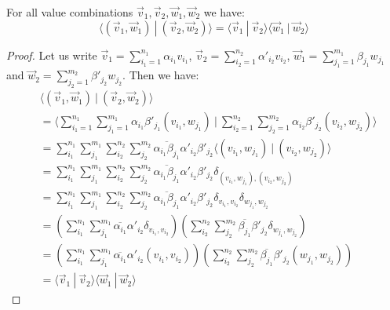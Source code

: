 \documentclass[a4paper,UKenglish,numberwithinsect,pdfa,anonymous]{lipics-v2021}
\theoremstyle{restatestyle}
\def\scal#1#2{\langle{#1}~|~{#2}\rangle}
\def\Pair#1#2{(#1,#2)} %
\def\Kron#1#2{\ensuremath{\delta_{#1,#2}}}
\begin{document}
\begin{theorem}\label{prop:InnerProdPairs} For all value combinations $\vec{v}_{1}, \vec{v}_{2}, \vec{w}_{1}, \vec{w}_{2}$ we have:
\[
\scal{\Pair{\vec{v}_{1}}{\vec{w}_{1}}}{\Pair{\vec{v}_{2}}{\vec{w}_{2}}} = \scal{\vec{v}_{1}}{\vec{v}_{2}}\scal{\vec{w}_{1}}{\vec{w}_{2}}
\]
\begin{proof}
    Let us write $\vec{v}_{1}=\sum_{i_1=1}^{n_1}\alpha_{i_1} v_{i_1}$, $\vec{v}_{2}=\sum_{i_2=1}^{n_2}\alpha'_{i_2} v_{i_2}$, $\vec{w}_{1}=\sum_{j_1=1}^{m_1}\beta_{j_1} w_{j_1}$ and $\vec{w}_{2}=\sum_{j_2=1}^{m_2}\beta'_{j_2} w_{j_2}$. Then we have:
    \begin{align*}
        &\scal{\Pair{\vec{v}_{1}}{\vec{w}_{1}}}{\Pair{\vec{v}_{2}}{\vec{w}_{2}}}\\
        &=\scal{\sum_{i_1=1}^{n_1}\sum_{j_1=1}^{m_1} \alpha_{i_1}\beta'_{j_1}\Pair{v_{i_1}}{w_{j_1}}}{\sum_{i_2=1}^{n_2}\sum_{j_2=1}^{m_2} \alpha_{i_2}\beta'_{j_2}\Pair{v_{i_2}}{w_{j_2}}}\\
        &=\sum_{i_1}^{n_1}\sum_{j_1}^{m_1}\sum_{i_2}^{n_2}\sum_{j_2}^{m_2} \overline{\alpha_{i_1}\beta_{j_1}} \alpha'_{i_2}\beta'_{j_2} \scal{\Pair{v_{i_1}}{w_{j_1}}}{\Pair{v_{i_2}}{w_{j_2}}}\\
        &=\sum_{i_1}^{n_1}\sum_{j_1}^{m_1}\sum_{i_2}^{n_2}\sum_{j_2}^{m_2} \overline{\alpha_{i_1}\beta_{j_1}} \alpha'_{i_2}\beta'_{j_2} \Kron{\Pair{v_{i_1}}{w_{j_1}}}{\Pair{v_{i_2}}{w_{j_2}}}\\
        &=\sum_{i_1}^{n_1}\sum_{j_1}^{m_1}\sum_{i_2}^{n_2}\sum_{j_2}^{m_2} \overline{\alpha_{i_1}\beta_{j_1}} \alpha'_{i_2}\beta'_{j_2} \Kron{v_{i_1}}{v_{i_2}}\Kron{w_{j_1}}{w_{j_2}}\\
        &=(\sum_{i_1}^{n_1}\sum_{j_1}^{m_1}\overline{\alpha_{i_1}}\alpha'_{i_2}\Kron{v_{i_1}}{v_{i_2}})(\sum_{i_2}^{n_2}\sum_{j_2}^{m_2} \overline{\beta_{j_1}} \beta'_{j_2} \Kron{w_{j_1}}{w_{j_2}})\\
        &=(\sum_{i_1}^{n_1}\sum_{j_1}^{m_1}\overline{\alpha_{i_1}}\alpha'_{i_2}\Pair{v_{i_1}}{v_{i_2}})(\sum_{i_2}^{n_2}\sum_{j_2}^{m_2} \overline{\beta_{j_1}} \beta'_{j_2} \Pair{w_{j_1}}{w_{j_2}})\\
        &=\scal{\vec{v}_{1}}{\vec{v}_{2}}\scal{\vec{w}_{1}}{\vec{w}_{2}}
	\tag*{\qedhere}
    \end{align*}
\end{proof}  

\end{theorem}
\end{document}
